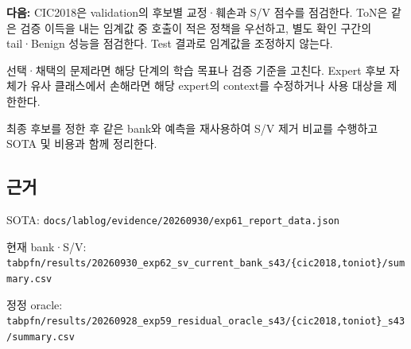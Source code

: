 \par\noindent \textbullet\enspace \textbf{다음:} CIC2018은 validation의 후보별 교정·훼손과 S/\allowbreak{}V 점수를 점검한다. ToN은 같은 검증 이득을 내는 임계값 중 호출이 적은 정책을 우선하고, 별도 확인 구간의 tail·Benign 성능을 점검한다. Test 결과로 임계값을 조정하지 않는다.


\par\noindent \textbullet\enspace 선택·채택의 문제라면 해당 단계의 학습 목표나 검증 기준을 고친다. Expert 후보 자체가 유사 클래스에서 손해라면 해당 expert의 context를 수정하거나 사용 대상을 제한한다.


\par\noindent \textbullet\enspace 최종 후보를 정한 후 같은 bank와 예측을 재사용하여 S/\allowbreak{}V 제거 비교를 수행하고 SOTA 및 비용과 함께 정리한다.


\subsection{근거}
\par\noindent \textbullet\enspace SOTA: \texttt{docs/\allowbreak{}\allowbreak{}lab\allowbreak{}log/\allowbreak{}\allowbreak{}evid\allowbreak{}ence/\allowbreak{}\allowbreak{}202\allowbreak{}60930/\allowbreak{}\allowbreak{}ex\allowbreak{}p61\_\allowbreak{}\allowbreak{}repo\allowbreak{}rt\_\allowbreak{}\allowbreak{}data.\allowbreak{}json}


\par\noindent \textbullet\enspace 현재 bank·S/\allowbreak{}V: \texttt{tabpfn/\allowbreak{}\allowbreak{}r\allowbreak{}esults/\allowbreak{}\allowbreak{}2\allowbreak{}0260930\_\allowbreak{}\allowbreak{}exp62\_\allowbreak{}\allowbreak{}sv\allowbreak{}\_\allowbreak{}\allowbreak{}current\allowbreak{}\_\allowbreak{}\allowbreak{}bank\_\allowbreak{}\allowbreak{}s4\allowbreak{}3/\allowbreak{}\allowbreak{}\{\allowbreak{}cic20\allowbreak{}18,\allowbreak{}tonio\allowbreak{}t\}\allowbreak{}/\allowbreak{}\allowbreak{}summa\allowbreak{}ry.\allowbreak{}csv}


\par\noindent \textbullet\enspace 정정 oracle: \texttt{tabpfn/\allowbreak{}\allowbreak{}r\allowbreak{}esults/\allowbreak{}\allowbreak{}2\allowbreak{}0260928\_\allowbreak{}\allowbreak{}exp59\_\allowbreak{}\allowbreak{}re\allowbreak{}sidual\_\allowbreak{}\allowbreak{}o\allowbreak{}racle\_\allowbreak{}\allowbreak{}s4\allowbreak{}3/\allowbreak{}\allowbreak{}\{\allowbreak{}cic20\allowbreak{}18,\allowbreak{}tonio\allowbreak{}t\}\allowbreak{}\_\allowbreak{}\allowbreak{}s43/\allowbreak{}\allowbreak{}s\allowbreak{}ummary.\allowbreak{}c\allowbreak{}sv}


